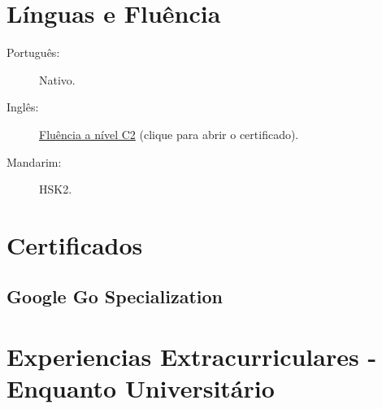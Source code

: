 \documentclass[letterpaper]{../cls/twentysecondcv} %
\begin{document}
\vspace{0.2cm}
\section{Línguas e Fluência}

\begin{description}
\item[Português:] Nativo.
\item[Inglês:] \href{https://www.efset.org/cert/hqg62J}{Fluência a nível C2} (clique para abrir o certificado).
\item[Mandarim:] HSK2.
\end{description}

\vspace{0.2cm}



\newpage %

\makeprofileNoExtra %

\section{\LARGE{Certificados}}
\subsection{\textbf{Google Go Specialization}}




\newpage
\makeprofileNoExtra

\section{Experiencias Extracurriculares - Enquanto Universitário}
\end{document}
